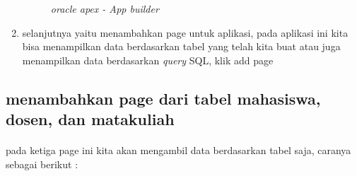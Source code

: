 \documentclass[12pt]{ociamthesis}  %
\begin{document}
\begin{enumerate}
\begin{figure}[H]
    \caption{\textit{oracle apex - App builder}}
    \label{foto21}
 	\end{figure}
	\item selanjutnya yaitu menambahkan page untuk aplikasi, pada aplikasi ini kita bisa menampilkan data berdasarkan tabel yang telah kita buat atau juga menampilkan data berdasarkan \textit{query} SQL, klik add page
\end{enumerate}
\subsection{menambahkan page dari tabel mahasiswa, dosen, dan matakuliah}
\paragraph{}
pada ketiga page ini kita akan mengambil data berdasarkan tabel saja, caranya sebagai berikut :
\end{document}
